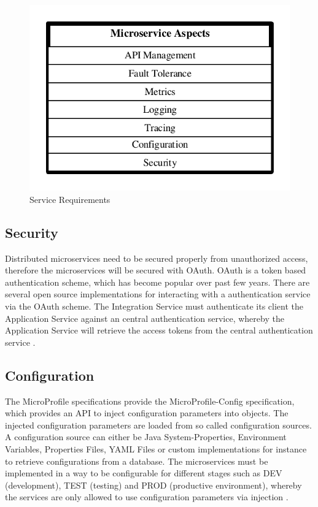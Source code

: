 \begin{figure}[htbp]
	\centering
	\includegraphics[scale=1]{images/esboc-requirement-services.pdf}
	\caption{Service Requirements}
	\label{fig:esboc-aspects}
\end{figure} 

\subsection{Security}
\label{sec:esboc-aspects-security}
Distributed microservices need to be secured properly from unauthorized access, therefore the microservices will be secured with OAuth. OAuth is a token based authentication scheme, which has become popular over past few years. There are several open source implementations for interacting with a authentication service via the OAuth scheme. The Integration Service must authenticate its client the Application Service against an central authentication service, whereby the Application Service will retrieve the access tokens from the central authentication service \cite{OAuth2018}.

\subsection{Configuration}
\label{sec:esboc-aspects-config}
The MicroProfile specifications provide the MicroProfile-Config specification, which provides an API to inject configuration parameters into objects. The injected configuration parameters are loaded from so called configuration sources. A configuration source can either be Java System-Properties, Environment Variables, Properties Files, YAML Files or custom implementations for instance to retrieve configurations from a database. The microservices must be implemented in a way to be configurable for different stages such as DEV (development), TEST (testing) and PROD (productive environment), whereby  the services are only allowed to use configuration parameters via injection  \cite{EclipseMicroprofileConfig2018}.

